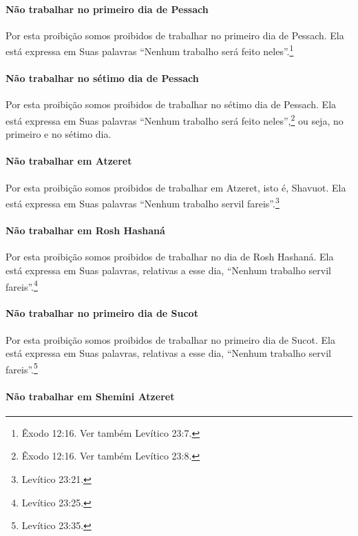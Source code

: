\begin{multicols}{2}
\paragraph{Não trabalhar no primeiro dia de Pessach\starr{}}

Por esta proibição somos proibidos de trabalhar no primeiro dia de
Pessach\starr. Ela está expressa em Suas palavras ``Nenhum trabalho será
feito neles''.\footnote{Êxodo 12:16. Ver também Levítico 23:7.}

\paragraph{Não trabalhar no sétimo dia de Pessach\starr{}}

Por esta proibição somos proibidos de trabalhar no sétimo dia de
Pessach\starr. Ela está expressa em Suas palavras ``Nenhum trabalho será
feito neles'',\footnote{Êxodo 12:16. Ver também Levítico 23:8.} ou seja, no primeiro e no sétimo dia.

\paragraph{Não trabalhar em Atzeret\starr}

Por esta proibição somos proibidos de trabalhar em Atzeret\starr, isto é,
Shavuot\starr. Ela está expressa em Suas palavras ``Nenhum trabalho servil
fareis''.\footnote{Levítico 23:21.}

\paragraph{Não trabalhar em Rosh Hashaná\starr}

Por esta proibição somos proibidos de trabalhar no dia de Rosh Hashaná\starr. Ela está expressa em Suas palavras, relativas a esse dia,
``Nenhum trabalho servil fareis''.\footnote{Levítico 23:25.}

\paragraph{Não trabalhar no primeiro dia de Sucot\starr}

Por esta proibição somos proibidos de trabalhar no primeiro dia de
Sucot\starr. Ela está expressa em Suas palavras, relativas a esse dia,
``Nenhum trabalho servil fareis''.\footnote{Levítico 23:35.}

\paragraph{Não trabalhar em Shemini Atzeret\starr}


\end{multicols}

